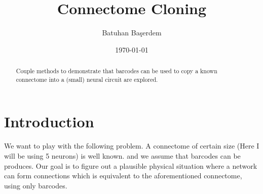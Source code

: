 \documentclass[%
 reprint,
 amsmath,amssymb,
 aps,
]{revtex4-1}
\begin{document}

\title{Connectome Cloning}%

\author{Batuhan Başerdem}
 
%




\date{\today}%

\begin{abstract}
Couple methods to demonstrate that barcodes can be used to copy a known connectome into a (small) neural circuit are explored.
\end{abstract}

\maketitle


\section{\label{sec:level1}Introduction}

We want to play with the following problem. A connectome of certain size (Here I will be using 5 neurons) is well known. and we assume that barcodes can be produces. Our goal is to figure out a plausible physical situation where a network can form connections which is equivalent to the aforementioned connectome, using only barcodes.
\end{document}

